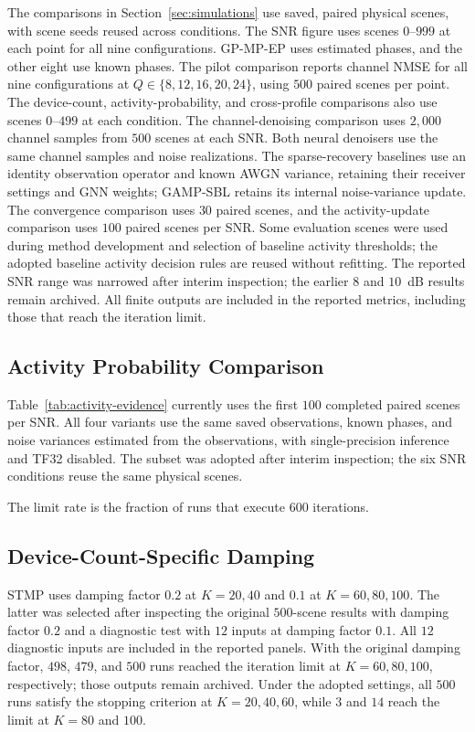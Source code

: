The comparisons in Section~\ref{sec:simulations} use saved, paired physical
scenes, with scene seeds reused across conditions.
The SNR figure uses scenes $0$--$999$ at each point for all
nine configurations. GP-MP-EP uses estimated phases, and the other eight
use known phases.
The pilot comparison reports channel NMSE for all nine configurations
at $Q\in\{8,12,16,20,24\}$, using $500$ paired scenes per point.
The device-count, activity-probability, and cross-profile
comparisons also use scenes $0$--$499$ at each condition.
The channel-denoising comparison uses $2{,}000$ channel samples from
$500$ scenes at each SNR. Both neural denoisers use the same channel
samples and noise realizations. The sparse-recovery baselines use an
identity observation operator and known AWGN variance, retaining their
receiver settings and GNN weights; GAMP-SBL retains its internal
noise-variance update.
The convergence comparison uses $30$ paired
scenes, and the activity-update comparison uses $100$ paired scenes per SNR.
Some evaluation scenes were used during method development and
selection of baseline activity thresholds; the adopted baseline activity decision rules are
reused without refitting. The reported SNR range was narrowed after
interim inspection; the earlier $8$ and $10$~dB results remain archived.
All finite outputs are included in the reported metrics, including those that
reach the iteration limit.

\subsection{Activity Probability Comparison}
\label{app:activity-evidence-protocol}

Table~\ref{tab:activity-evidence} currently uses the first $100$ completed
paired scenes per SNR.
All four variants use the same saved observations, known phases, and
noise variances estimated from the observations, with single-precision
inference and TF32 disabled.
The subset was adopted after interim inspection; the six SNR conditions
reuse the same physical scenes.

The limit rate is the fraction of runs that execute $600$ iterations.

\subsection{Device-Count-Specific Damping}

STMP uses damping factor $0.2$ at $K=20,40$ and $0.1$ at
$K=60,80,100$. The latter was selected after inspecting the original
$500$-scene results with damping factor $0.2$ and a diagnostic test with $12$ inputs at
damping factor $0.1$. All $12$ diagnostic inputs are included in the reported panels.
With the original damping factor, $498$, $479$, and $500$ runs reached the
iteration limit at $K=60,80,100$, respectively; those outputs remain
archived. Under the adopted settings, all $500$ runs satisfy the stopping criterion at
$K=20,40,60$, while $3$ and $14$ reach the limit at $K=80$ and $100$.


